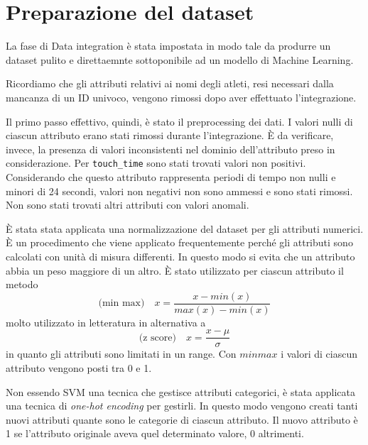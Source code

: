 \section{Preparazione del dataset}

La fase di Data integration è stata impostata in modo tale da produrre un dataset pulito e direttaemnte sottoponibile ad un modello di Machine Learning.

Ricordiamo che gli attributi relativi ai nomi degli atleti, resi necessari dalla mancanza di un ID univoco, vengono rimossi dopo aver effettuato l'integrazione.

Il primo passo effettivo, quindi, è stato il preprocessing dei dati. I valori nulli di ciascun attributo erano stati rimossi durante l’integrazione. È da verificare, invece, la presenza di valori inconsistenti nel dominio dell’attributo preso in considerazione.
Per \texttt{touch\_time} sono stati trovati valori non positivi. Considerando che questo attributo rappresenta periodi di tempo non nulli e minori di 24 secondi, valori non negativi non sono ammessi e sono stati rimossi.
Non sono stati trovati altri attributi con valori anomali.

\par

È stata stata applicata una normalizzazione del dataset per gli attributi numerici. È un procedimento che viene applicato frequentemente perché gli attributi sono calcolati con unità di misura differenti. In questo modo si evita che un attributo abbia un peso maggiore di un altro. È stato utilizzato per ciascun attributo il metodo
$$ \text{(min max)}\quad x = \dfrac{x - min(x)}{max(x) - min(x)} $$ 
molto utilizzato in letteratura in alternativa a
$$\text{(z score)}\quad x = \dfrac{x - \mu}{\sigma} $$
 in quanto gli attributi sono limitati in un range. Con $min max$ i valori di ciascun attributo vengono posti tra 0 e 1.

\par
Non essendo SVM una tecnica che gestisce attributi categorici, è stata applicata una tecnica di \textit{one-hot encoding} per gestirli. In questo modo vengono creati tanti nuovi attributi quante sono le categorie di ciascun attributo. Il nuovo attributo è 1 se l’attributo originale aveva quel determinato valore, 0 altrimenti.